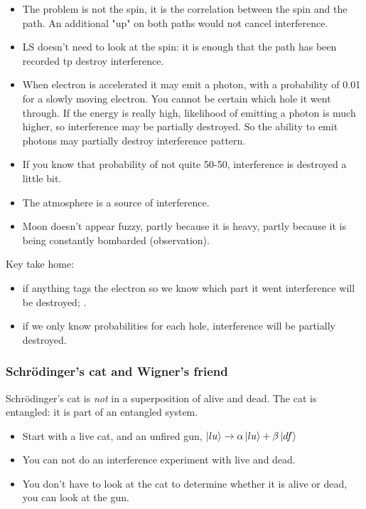 \documentclass[]{article}
\begin{document}
\begin{itemize}
	\item The problem is not the spin, it is the correlation between the spin and the path. An additional "up" on both paths would not cancel interference.
	\item LS doesn't need to look at the spin: it is enough that the path has been recorded tp destroy interference.
	\item When electron is accelerated it may emit a photon, with a probability of 0.01 for a slowly moving electron. You cannot be certain which hole it went through. If the energy is really high, likelihood of emitting a photon is much higher, so interference may be partially destroyed. So the ability to emit photons may partially destroy interference pattern. 
	\item If you know that probability of not quite 50-50, interference is destroyed a little bit.
	\item The atmosphere is a source of interference.
	\item Moon doesn't appear fuzzy, partly because it is heavy, partly because it is being constantly bombarded (observation).
\end{itemize}

Key take home: \begin{itemize}
	\item if anything tags the electron so we know which part it went interference will be destroyed; .
	\item if we only know probabilities for each hole, interference will be partially destroyed.
\end{itemize}

\subsubsection{Schr\"odinger's cat and Wigner's friend}

Schr\"odinger's cat is \emph{not} in a superposition of alive and dead. The cat is entangled: it is part of an entangled system.
\begin{itemize}
	\item Start with a live cat, and an unfired gun, $\ket{lu}\rightarrow\alpha\ket{lu}+\beta\ket{df}$
	\item You can not do an interference experiment with live and dead.
	\item You don't have to look at the cat to determine whether it is alive or dead, you can look at the gun.
\end{itemize}
\end{document}
